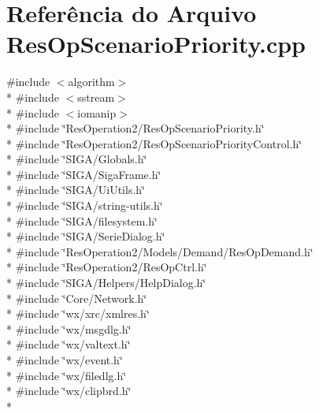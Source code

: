 \section{Referência do Arquivo Res\+Op\+Scenario\+Priority.\+cpp}
\label{_res_op_scenario_priority_8cpp}
{\ttfamily \#include $<$algorithm$>$}\\*
{\ttfamily \#include $<$sstream$>$}\\*
{\ttfamily \#include $<$iomanip$>$}\\*
{\ttfamily \#include \char`\"{}Res\+Operation2/\+Res\+Op\+Scenario\+Priority.\+h\char`\"{}}\\*
{\ttfamily \#include \char`\"{}Res\+Operation2/\+Res\+Op\+Scenario\+Priority\+Control.\+h\char`\"{}}\\*
{\ttfamily \#include \char`\"{}S\+I\+G\+A/\+Globals.\+h\char`\"{}}\\*
{\ttfamily \#include \char`\"{}S\+I\+G\+A/\+Siga\+Frame.\+h\char`\"{}}\\*
{\ttfamily \#include \char`\"{}S\+I\+G\+A/\+Ui\+Utils.\+h\char`\"{}}\\*
{\ttfamily \#include \char`\"{}S\+I\+G\+A/string-\/utils.\+h\char`\"{}}\\*
{\ttfamily \#include \char`\"{}S\+I\+G\+A/filesystem.\+h\char`\"{}}\\*
{\ttfamily \#include \char`\"{}S\+I\+G\+A/\+Serie\+Dialog.\+h\char`\"{}}\\*
{\ttfamily \#include \char`\"{}Res\+Operation2/\+Models/\+Demand/\+Res\+Op\+Demand.\+h\char`\"{}}\\*
{\ttfamily \#include \char`\"{}Res\+Operation2/\+Res\+Op\+Ctrl.\+h\char`\"{}}\\*
{\ttfamily \#include \char`\"{}S\+I\+G\+A/\+Helpers/\+Help\+Dialog.\+h\char`\"{}}\\*
{\ttfamily \#include \char`\"{}Core/\+Network.\+h\char`\"{}}\\*
{\ttfamily \#include \char`\"{}wx/xrc/xmlres.\+h\char`\"{}}\\*
{\ttfamily \#include \char`\"{}wx/msgdlg.\+h\char`\"{}}\\*
{\ttfamily \#include \char`\"{}wx/valtext.\+h\char`\"{}}\\*
{\ttfamily \#include \char`\"{}wx/event.\+h\char`\"{}}\\*
{\ttfamily \#include \char`\"{}wx/filedlg.\+h\char`\"{}}\\*
{\ttfamily \#include \char`\"{}wx/clipbrd.\+h\char`\"{}}\\*
